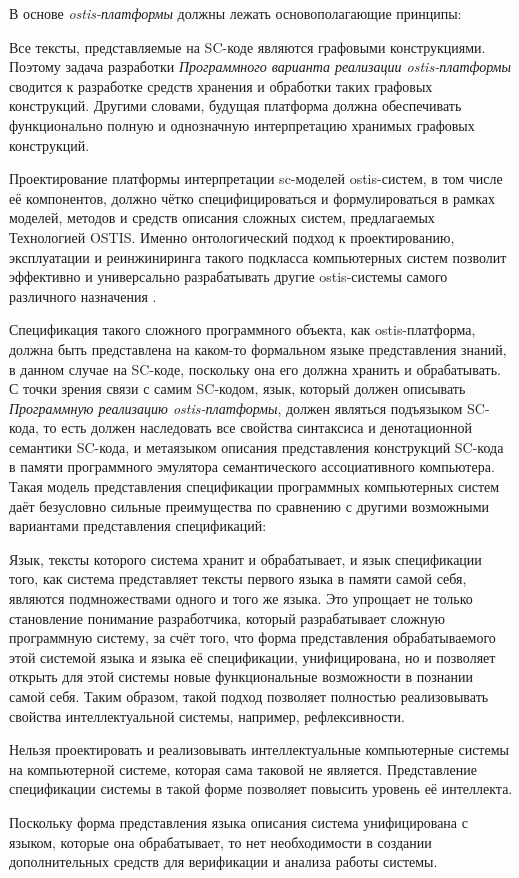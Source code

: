 В основе \textit{ostis-платформы} должны лежать основополагающие принципы:
\begin{textitemize}
    \item Все тексты, представляемые на SC-коде являются графовыми конструкциями. Поэтому задача разработки \textit{Программного варианта реализации ostis-платформы} сводится к разработке средств хранения и обработки таких графовых конструкций. Другими словами, будущая платформа должна обеспечивать функционально полную и однозначную интерпретацию хранимых графовых конструкций.
    \item Проектирование платформы интерпретации sc-моделей ostis-систем, в том числе её компонентов, должно чётко специфицироваться и формулироваться в рамках моделей, методов и средств описания сложных систем, предлагаемых Технологией OSTIS. Именно онтологический подход к проектированию, эксплуатации и реинжиниринга такого подкласса компьютерных систем позволит эффективно и универсально разрабатывать другие ostis-системы самого различного назначения .
\end{textitemize}

Спецификация такого сложного программного объекта, как ostis-платформа, должна быть представлена на каком-то формальном языке представления знаний, в данном случае на SC-коде, поскольку она его должна хранить и обрабатывать. С точки зрения связи с самим SC-кодом, язык, который должен описывать \textit{Программную реализацию ostis-платформы}, должен являться подъязыком SC-кода, то есть должен наследовать все свойства синтаксиса и денотационной семантики SC-кода, и метаязыком описания представления конструкций SC-кода в памяти программного эмулятора семантического ассоциативного компьютера. Такая модель представления спецификации программных компьютерных систем даёт безусловно сильные преимущества по сравнению с другими возможными вариантами представления спецификаций:
\begin{textitemize}
    \item Язык, тексты которого система хранит и обрабатывает, и язык спецификации того, как система представляет тексты первого языка в памяти самой себя, являются подмножествами одного и того же языка. Это упрощает не только становление понимание разработчика, который разрабатывает сложную программную систему, за счёт того, что форма представления обрабатываемого этой системой языка и языка её спецификации, унифицирована, но и позволяет открыть для этой системы новые функциональные возможности в познании самой себя. Таким образом, такой подход позволяет полностью реализовывать свойства интеллектуальной системы, например, рефлексивности.
    \item Нельзя проектировать и реализовывать интеллектуальные компьютерные системы на компьютерной системе, которая сама таковой не является. Представление спецификации системы в такой форме позволяет повысить уровень её интеллекта.
    \item Поскольку форма представления языка описания система унифицирована с языком, которые она обрабатывает, то нет необходимости в создании дополнительных средств для верификации и анализа работы системы.
\end{textitemize}

